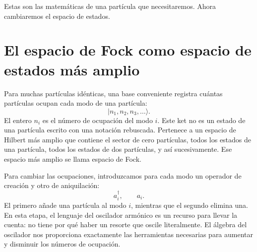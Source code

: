 \begin{classroomqa}
\end{classroomqa}

Estas son las matemáticas de una partícula que necesitaremos. Ahora cambiaremos el espacio de estados.

\section{El espacio de Fock como espacio de estados más amplio}

Para muchas partículas idénticas, una base conveniente registra cuántas partículas ocupan cada modo de una partícula:
\begin{equation}
|n_1,n_2,n_3,\ldots\rangle.
\label{eq:l07-fock-basis}
\end{equation}
El entero \(n_i\) es el número de ocupación del modo \(i\). Este ket no es un estado de una partícula escrito con una notación rebuscada. Pertenece a un espacio de Hilbert más amplio que contiene el sector de cero partículas, todos los estados de una partícula, todos los estados de dos partículas, y así sucesivamente. Ese espacio más amplio se llama espacio de Fock.

Para cambiar las ocupaciones, introduzcamos para cada modo un operador de creación y otro de aniquilación:
\begin{equation}
a_i^\dagger,\qquad a_i.
\end{equation}
El primero añade una partícula al modo \(i\), mientras que el segundo elimina una. En esta etapa, el lenguaje del oscilador armónico es un recurso para llevar la cuenta: no tiene por qué haber un resorte que oscile literalmente. El álgebra del oscilador nos proporciona exactamente las herramientas necesarias para aumentar y disminuir los números de ocupación.

